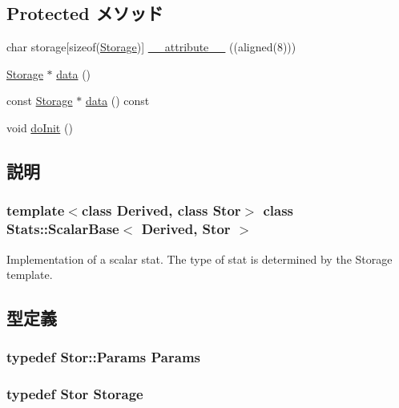 \subsection*{Protected メソッド}
\begin{DoxyCompactItemize}
\item 
char storage\mbox{[}sizeof(\hyperlink{classStats_1_1ScalarBase_a5d4a6db0e7c32292f54a08d05c671bd1}{Storage})\mbox{]} \hyperlink{classStats_1_1ScalarBase_a72ec214acf2091c80c5794662602c42f}{\_\-\_\-attribute\_\-\_\-} ((aligned(8)))
\item 
\hyperlink{classStats_1_1ScalarBase_a5d4a6db0e7c32292f54a08d05c671bd1}{Storage} $\ast$ \hyperlink{classStats_1_1ScalarBase_a6616795ceb2f25c33a3c2d6c0a387514}{data} ()
\item 
const \hyperlink{classStats_1_1ScalarBase_a5d4a6db0e7c32292f54a08d05c671bd1}{Storage} $\ast$ \hyperlink{classStats_1_1ScalarBase_aabedc9303ac5bae8af18ceaeeb7fe44b}{data} () const 
\item 
void \hyperlink{classStats_1_1ScalarBase_acbb3b2ff6c84b7ae0dcc576f85bee3b5}{doInit} ()
\end{DoxyCompactItemize}


\subsection{説明}
\subsubsection*{template$<$class Derived, class Stor$>$ class Stats::ScalarBase$<$ Derived, Stor $>$}

Implementation of a scalar stat. The type of stat is determined by the Storage template. 

\subsection{型定義}
\hypertarget{classStats_1_1ScalarBase_a24c5f88dc162c95e0b32ade67a7ea674}{
\subsubsection[{Params}]{\setlength{\rightskip}{0pt plus 5cm}typedef Stor::Params {\bf Params}}}
\label{classStats_1_1ScalarBase_a24c5f88dc162c95e0b32ade67a7ea674}
\hypertarget{classStats_1_1ScalarBase_a5d4a6db0e7c32292f54a08d05c671bd1}{
\subsubsection[{Storage}]{\setlength{\rightskip}{0pt plus 5cm}typedef Stor {\bf Storage}}}
\label{classStats_1_1ScalarBase_a5d4a6db0e7c32292f54a08d05c671bd1}


